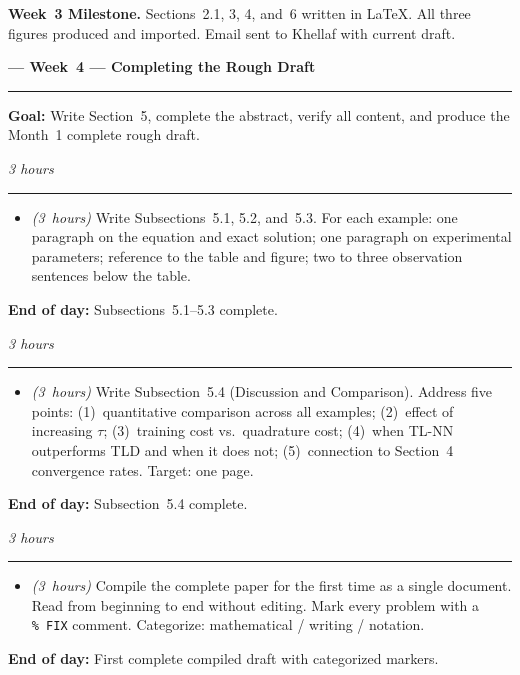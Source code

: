\documentclass[12pt,a4paper]{article}
\newcommand{\hrs}[1]{\textit{\color{darkgray}(#1~hours)}}
\newcommand{\weekheading}[2]{%
  \vspace{0.8em}
  \noindent
  {\large\bfseries\color{midblue}--- Week~#1 ---
  \hfill\normalsize\normalfont\color{darkgray}#2}
  \vspace{0.2em}
  \\{\color{midblue}\rule{\linewidth}{0.6pt}}
  \vspace{0.3em}
}
\newcommand{\dayheading}[2]{%
  \vspace{0.3em}
  \noindent{\bfseries\color{darkblue}Day~#1}%
  \hfill{\small\color{darkgray}\textit{#2}}%
  \\[-0.4em]{\color{midgray}\rule{\linewidth}{0.4pt}}%
  \vspace{0.1em}
}
\begin{document}
\begin{tcolorbox}[milestonestyle]
\noindent\textbf{\color{darkred}Week~3 Milestone.}
Sections~2.1, 3, 4, and~6 written in \LaTeX.
All three figures produced and imported.
Email sent to Khellaf with current draft.
\end{tcolorbox}

\weekheading{4}{Completing the Rough Draft}

\noindent\textbf{Goal:}
Write Section~5, complete the abstract, verify all content,
and produce the Month~1 complete rough draft.

\vspace{0.5em}

\begin{tcolorbox}[daystyle]
\dayheading{22}{3 hours}
\begin{itemize}[leftmargin=1.8em,itemsep=3pt]
  \item[\color{midblue}$\bullet$]
    \hrs{3} Write Subsections~5.1, 5.2, and~5.3. For
    each example: one paragraph on the equation and exact
    solution; one paragraph on experimental parameters;
    reference to the table and figure; two to three
    observation sentences below the table.
\end{itemize}
\noindent\textbf{End of day:} Subsections~5.1--5.3 complete.
\end{tcolorbox}

\begin{tcolorbox}[daystyle]
\dayheading{23}{3 hours}
\begin{itemize}[leftmargin=1.8em,itemsep=3pt]
  \item[\color{midblue}$\bullet$]
    \hrs{3} Write Subsection~5.4 (Discussion and
    Comparison). Address five points: (1)~quantitative
    comparison across all examples; (2)~effect of
    increasing $\tau$; (3)~training cost vs.\ quadrature
    cost; (4)~when TL-NN outperforms TLD and when it does
    not; (5)~connection to Section~4 convergence rates.
    Target: one page.
\end{itemize}
\noindent\textbf{End of day:} Subsection~5.4 complete.
\end{tcolorbox}

\begin{tcolorbox}[daystyle]
\dayheading{24}{3 hours}
\begin{itemize}[leftmargin=1.8em,itemsep=3pt]
  \item[\color{midblue}$\bullet$]
    \hrs{3} Compile the complete paper for the first time
    as a single document. Read from beginning to end
    without editing. Mark every problem with a
    \texttt{\%~FIX} comment. Categorize: mathematical /
    writing / notation.
\end{itemize}
\noindent\textbf{End of day:}
First complete compiled draft with categorized markers.
\end{tcolorbox}
\end{document}
